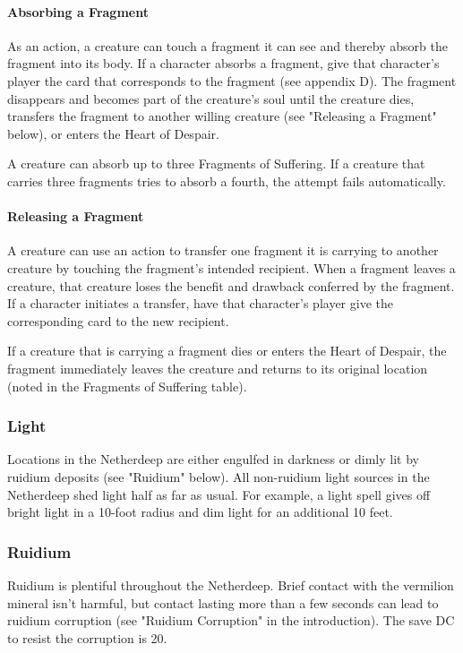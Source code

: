 \documentclass[10pt,a4paper,twoside,twocolumn,openany,nodeprecatedcode]{dndbook}
\begin{document}
\paragraph{Absorbing a Fragment}
As an action, a creature can touch a fragment it can see and thereby absorb the fragment into its body. If a character absorbs a fragment, give that character's player the card that corresponds to the fragment (see appendix D). The fragment disappears and becomes part of the creature's soul until the creature dies, transfers the fragment to another willing creature (see "Releasing a Fragment" below), or enters the Heart of Despair.

A creature can absorb up to three Fragments of Suffering. If a creature that carries three fragments tries to absorb a fourth, the attempt fails automatically.

\paragraph{Releasing a Fragment}
A creature can use an action to transfer one fragment it is carrying to another creature by touching the fragment's intended recipient. When a fragment leaves a creature, that creature loses the benefit and drawback conferred by the fragment. If a character initiates a transfer, have that character's player give the corresponding card to the new recipient.

If a creature that is carrying a fragment dies or enters the Heart of Despair, the fragment immediately leaves the creature and returns to its original location (noted in the Fragments of Suffering table).


\subsubsection{Light}
Locations in the Netherdeep are either engulfed in darkness or dimly lit by ruidium deposits (see "Ruidium" below). All non-ruidium light sources in the Netherdeep shed light half as far as usual. For example, a light spell gives off bright light in a 10-foot radius and dim light for an additional 10 feet.

\subsubsection{Ruidium}
Ruidium is plentiful throughout the Netherdeep. Brief contact with the vermilion mineral isn't harmful, but contact lasting more than a few seconds can lead to ruidium corruption (see "Ruidium Corruption" in the introduction). The save DC to resist the corruption is 20.
\end{document}
